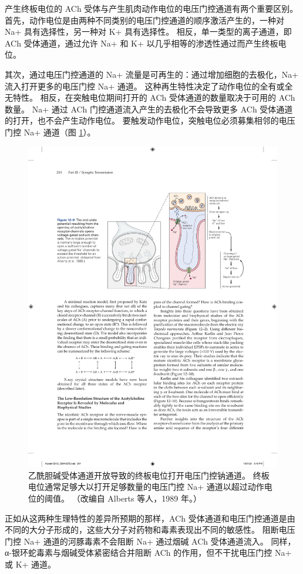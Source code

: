 产生终板电位的 ACh 受体与产生肌肉动作电位的电压门控通道有两个重要区别。 
首先，动作电位是由两种不同类别的电压门控通道的顺序激活产生的，一种对 Na+ 具有选择性，另一种对 K+ 具有选择性。 
相反，单一类型的离子通道，即 ACh 受体通道，通过允许 Na+ 和 K+ 以几乎相等的渗透性通过而产生终板电位。


其次，通过电压门控通道的 Na+ 流量是可再生的：通过增加细胞的去极化，Na+ 流入打开更多的电压门控 Na+ 通道。 
这种再生特性决定了动作电位的全有或全无特性。 
相反，在突触电位期间打开的 ACh 受体通道的数量取决于可用的 ACh 数量。 
Na+ 通过 ACh 门控通道流入产生的去极化不会导致更多 ACh 受体通道的打开，也不会产生动作电位。 
要触发动作电位，突触电位必须募集相邻的电压门控 Na+ 通道（图 \ref{fig:12_9}）。

\begin{figure}[htbp]
	\centering
	\includegraphics[width=0.7\linewidth]{chap12/fig_12_9}
	\caption{乙酰胆碱受体通道开放导致的终板电位打开电压门控钠通道。 终板电位通常足够大以打开足够数量的电压门控 Na+ 通道以超过动作电位的阈值。 （改编自 Alberts 等人，1989 年。）}
	\label{fig:12_9}
\end{figure}


正如从这两种生理特性的差异所预期的那样，ACh 受体通道和电压门控通道是由不同的大分子形成的，这些大分子对药物和毒素表现出不同的敏感性。 
阻断电压门控 Na+ 通道的河豚毒素不会阻断 Na+ 通过烟碱 ACh 受体通道流入。 
同样，α-银环蛇毒素与烟碱受体紧密结合并阻断 ACh 的作用，但不干扰电压门控 Na+ 或 K+ 通道。


